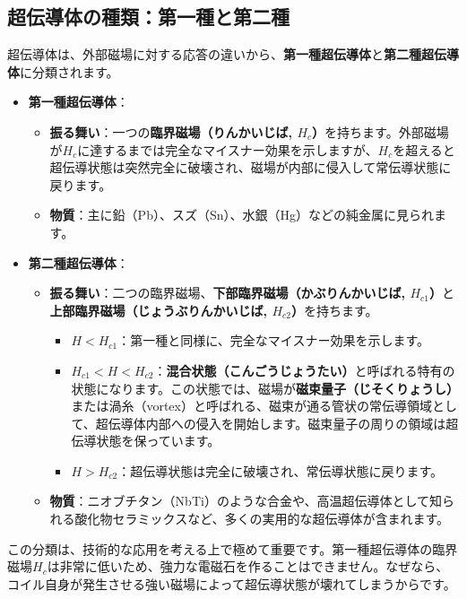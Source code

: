 \documentclass[11pt,a4paper]{ltjsarticle}
\begin{document}
\subsection{超伝導体の種類：第一種と第二種}
超伝導体は、外部磁場に対する応答の違いから、\textbf{第一種超伝導体}と\textbf{第二種超伝導体}に分類されます。
\begin{itemize}
    \item \textbf{第一種超伝導体}：
    \begin{itemize}
        \item \textbf{振る舞い}：一つの\textbf{臨界磁場（りんかいじば, $H_c$）}を持ちます。外部磁場が$H_c$に達するまでは完全なマイスナー効果を示しますが、$H_c$を超えると超伝導状態は突然完全に破壊され、磁場が内部に侵入して常伝導状態に戻ります\cite{ref1}。
        \item \textbf{物質}：主に鉛（Pb）、スズ（Sn）、水銀（Hg）などの純金属に見られます\cite{ref1}。
    \end{itemize}
    \item \textbf{第二種超伝導体}：
    \begin{itemize}
        \item \textbf{振る舞い}：二つの臨界磁場、\textbf{下部臨界磁場（かぶりんかいじば, $H_{c1}$）}と\textbf{上部臨界磁場（じょうぶりんかいじば, $H_{c2}$）}を持ちます\cite{ref1}。
        \begin{itemize}
            \item $H<H_{c1}$：第一種と同様に、完全なマイスナー効果を示します。
            \item $H_{c1}<H<H_{c2}$：\textbf{混合状態（こんごうじょうたい）}と呼ばれる特有の状態になります。この状態では、磁場が\textbf{磁束量子（じそくりょうし）}または渦糸（vortex）と呼ばれる、磁束が通る管状の常伝導領域として、超伝導体内部への侵入を開始します。磁束量子の周りの領域は超伝導状態を保っています\cite{ref1}。
            \item $H>H_{c2}$：超伝導状態は完全に破壊され、常伝導状態に戻ります。
        \end{itemize}
        \item \textbf{物質}：ニオブチタン（NbTi）のような合金や、高温超伝導体として知られる酸化物セラミックスなど、多くの実用的な超伝導体が含まれます\cite{ref1}。
    \end{itemize}
\end{itemize}
この分類は、技術的な応用を考える上で極めて重要です。第一種超伝導体の臨界磁場$H_c$は非常に低いため、強力な電磁石を作ることはできません。なぜなら、コイル自身が発生させる強い磁場によって超伝導状態が壊れてしまうからです。
\end{document}
